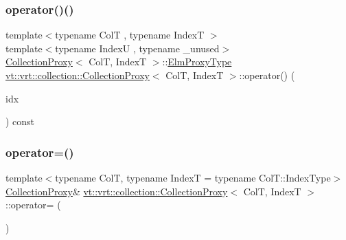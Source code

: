 \mbox{\label{structvt_1_1vrt_1_1collection_1_1_collection_proxy_a53d97b9ca0294b4254556620463708d9}} 
\subsubsection{\texorpdfstring{operator()()}{operator()()}\hspace{0.1cm}{\footnotesize\ttfamily [2/2]}}
{\footnotesize\ttfamily template$<$typename ColT , typename IndexT $>$ \\
template$<$typename IndexU , typename \+\_\+unused$>$ \\
\hyperlink{structvt_1_1vrt_1_1collection_1_1_collection_proxy}{Collection\+Proxy}$<$ ColT, IndexT $>$\+::\hyperlink{structvt_1_1vrt_1_1collection_1_1_collection_proxy_a892c21eae1dca37321d7973f72b55b0a}{Elm\+Proxy\+Type} \hyperlink{structvt_1_1vrt_1_1collection_1_1_collection_proxy}{vt\+::vrt\+::collection\+::\+Collection\+Proxy}$<$ ColT, IndexT $>$\+::operator() (\begin{DoxyParamCaption}\item[{IndexU const \&}]{idx }\end{DoxyParamCaption}) const}

\mbox{\label{structvt_1_1vrt_1_1collection_1_1_collection_proxy_ab70ea05660c740600207b58db48cc4f6}} 
\subsubsection{\texorpdfstring{operator=()}{operator=()}}
{\footnotesize\ttfamily template$<$typename ColT, typename IndexT = typename Col\+T\+::\+Index\+Type$>$ \\
\hyperlink{structvt_1_1vrt_1_1collection_1_1_collection_proxy}{Collection\+Proxy}\& \hyperlink{structvt_1_1vrt_1_1collection_1_1_collection_proxy}{vt\+::vrt\+::collection\+::\+Collection\+Proxy}$<$ ColT, IndexT $>$\+::operator= (\begin{DoxyParamCaption}\item[{\hyperlink{structvt_1_1vrt_1_1collection_1_1_collection_proxy}{Collection\+Proxy}$<$ ColT, IndexT $>$ const \&}]{ }\end{DoxyParamCaption})\hspace{0.3cm}{\ttfamily [default]}}

